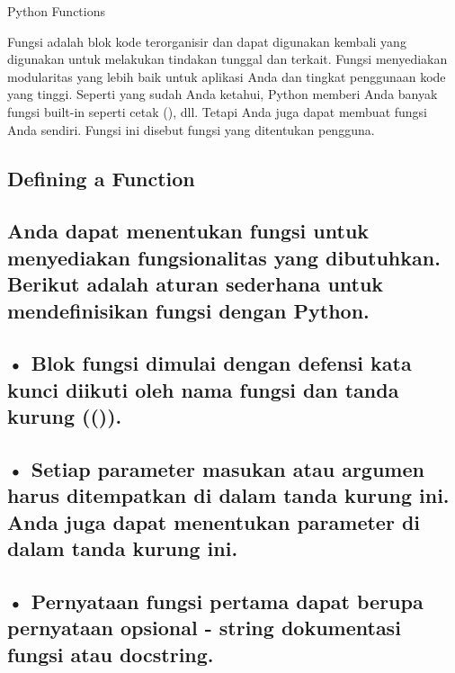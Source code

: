 \documentclass[a4paper,12pt]{report}
\begin{document}
\sloppy
\begin{center}{\fontsize{24pt}{24pt}\selectfont Python Functions \\}\end{center} \par
\vspace{12pt}
\begin{adjustwidth}{0.03in}{0.03in}
 \hspace*{0.5in} Fungsi adalah blok kode terorganisir dan dapat digunakan kembali yang digunakan untuk melakukan tindakan tunggal dan terkait. Fungsi menyediakan modularitas yang lebih baik untuk aplikasi Anda dan tingkat penggunaan kode yang tinggi. Seperti yang sudah Anda ketahui, Python memberi Anda banyak fungsi built-in seperti cetak (), dll. Tetapi Anda juga dapat membuat fungsi Anda sendiri. Fungsi ini disebut fungsi yang ditentukan pengguna.\end{adjustwidth}
 \par
\vspace{20pt}
\subsection*{Defining a Function}
 \par
\subsection*{ \hspace{10pt} Anda dapat menentukan fungsi untuk menyediakan fungsionalitas yang dibutuhkan. Berikut adalah aturan sederhana untuk mendefinisikan fungsi dengan Python.}
 \par
\subsection*{• Blok fungsi dimulai dengan defensi kata kunci diikuti oleh nama fungsi dan tanda kurung (()).}
 \par
\subsection*{• Setiap parameter masukan atau argumen harus ditempatkan di dalam tanda kurung ini. Anda juga dapat menentukan parameter di dalam tanda kurung ini.}
 \par
\subsection*{• Pernyataan fungsi pertama dapat berupa pernyataan opsional - string dokumentasi fungsi atau docstring.}
 \par
\end{document}
